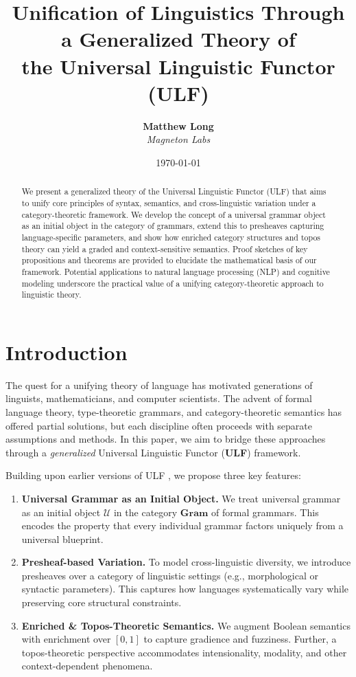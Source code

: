 \documentclass[12pt]{article}
\title{\textbf{Unification of Linguistics Through a Generalized Theory of\\
the Universal Linguistic Functor (ULF)}}
\author{
  \textbf{Matthew Long}\\
  \textit{Magneton Labs}
}
\date{\today}
\theoremstyle{plain}
\theoremstyle{definition}
\begin{document}
\maketitle

\begin{abstract}
We present a generalized theory of the Universal Linguistic Functor (ULF) that aims to unify core principles of syntax, semantics, and cross-linguistic variation under a category-theoretic framework. We develop the concept of a universal grammar object as an initial object in the category of grammars, extend this to presheaves capturing language-specific parameters, and show how enriched category structures and topos theory can yield a graded and context-sensitive semantics. Proof sketches of key propositions and theorems are provided to elucidate the mathematical basis of our framework. Potential applications to natural language processing (NLP) and cognitive modeling underscore the practical value of a unifying category-theoretic approach to linguistic theory.
\end{abstract}

\tableofcontents

\section{Introduction}\label{sec:intro}
The quest for a unifying theory of language has motivated generations of linguists, mathematicians, and computer scientists. The advent of formal language theory, type-theoretic grammars, and category-theoretic semantics has offered partial solutions, but each discipline often proceeds with separate assumptions and methods. In this paper, we aim to bridge these approaches through a \emph{generalized} Universal Linguistic Functor (\textbf{ULF}) framework.

Building upon earlier versions of ULF \cite{Lewis}, we propose three key features:
\begin{enumerate}
    \item \textbf{Universal Grammar as an Initial Object.} We treat universal grammar as an initial object \(\mathcal{U}\) in the category \(\mathbf{Gram}\) of formal grammars. This encodes the property that every individual grammar factors uniquely from a universal blueprint.
    \item \textbf{Presheaf-based Variation.} To model cross-linguistic diversity, we introduce presheaves over a category of linguistic settings (e.g., morphological or syntactic parameters). This captures how languages systematically vary while preserving core structural constraints.
    \item \textbf{Enriched \& Topos-Theoretic Semantics.} We augment Boolean semantics with enrichment over \([0,1]\) to capture gradience and fuzziness. Further, a topos-theoretic perspective accommodates intensionality, modality, and other context-dependent phenomena.
\end{enumerate}
\end{document}
